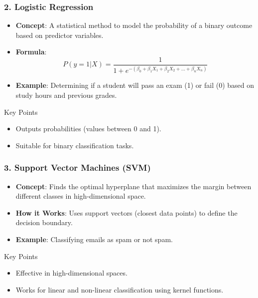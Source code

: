 \documentclass{beamer}
\begin{document}
\begin{frame}[fragile]
    \frametitle{2. Logistic Regression}
    \begin{itemize}
        \item \textbf{Concept}: A statistical method to model the probability of a binary outcome based on predictor variables.
        \item \textbf{Formula}:
        \begin{equation}
        P(y=1|X) = \frac{1}{1 + e^{-(\beta_0 + \beta_1X_1 + \beta_2X_2 + ... + \beta_nX_n)}}
        \end{equation}
        \item \textbf{Example}: Determining if a student will pass an exam (1) or fail (0) based on study hours and previous grades.
    \end{itemize}
    
    \begin{block}{Key Points}
        \begin{itemize}
            \item Outputs probabilities (values between 0 and 1).
            \item Suitable for binary classification tasks.
        \end{itemize}
    \end{block}
\end{frame}

\begin{frame}[fragile]
    \frametitle{3. Support Vector Machines (SVM)}
    \begin{itemize}
        \item \textbf{Concept}: Finds the optimal hyperplane that maximizes the margin between different classes in high-dimensional space.
        \item \textbf{How it Works}: Uses support vectors (closest data points) to define the decision boundary.
        \item \textbf{Example}: Classifying emails as spam or not spam.
    \end{itemize}
    
    \begin{block}{Key Points}
        \begin{itemize}
            \item Effective in high-dimensional spaces.
            \item Works for linear and non-linear classification using kernel functions.
        \end{itemize}
    \end{block}
\end{frame}
\end{document}
